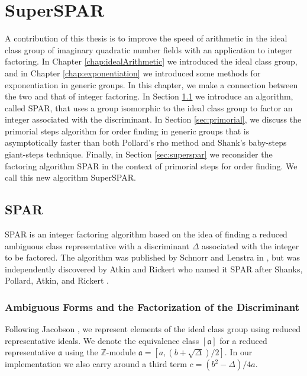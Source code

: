 \documentclass{ucalgthes1}
\theoremstyle{plain}
\theoremstyle{definition}
\newcommand{\ZZ}{\mathbb{Z}}
\begin{document}
\chapter{SuperSPAR}
\label{chap:superspar}

A contribution of this thesis is to improve the speed of arithmetic in the ideal class group of imaginary quadratic number fields with an application to integer factoring.  In Chapter \ref{chap:idealArithmetic} we introduced the ideal class group, and in Chapter \ref{chap:exponentiation} we introduced some methods for exponentiation in generic groups.  In this chapter, we make a connection between the two and that of integer factoring.  In Section \ref{sec:spar} we introduce an algorithm, called SPAR, that uses a group isomorphic to the ideal class group to factor an integer associated with the discriminant.  In Section \ref{sec:primorial}, we discuss the primorial steps algorithm for order finding in generic groups that is asymptotically faster than both Pollard's rho method and Shank's baby-steps giant-steps technique.  Finally, in Section \ref{sec:superspar} we reconsider the factoring algorithm SPAR in the context of primorial steps for order finding.  We call this new algorithm SuperSPAR.

\section{SPAR}
\label{sec:spar}

SPAR is an integer factoring algorithm based on the idea of finding a reduced ambiguous class representative with a discriminant $\Delta$ associated with the integer to be factored.  The algorithm was published by Schnorr and Lenstra in \cite{Schnorr1984}, but was independently discovered by Atkin and Rickert who named it SPAR after Shanks, Pollard, Atkin, and Rickert \cite[p.182]{Jacobson1999}.

\subsection{Ambiguous Forms and the Factorization of the Discriminant}

Following Jacobson \cite{Jacobson1999}, we represent elements of the ideal class group using reduced representative ideals.  We denote the equivalence class $[\mathfrak a]$ for a reduced representative $\mathfrak a$ using the $\ZZ$\mbox{-}module $\mathfrak a = [a, (b + \sqrt\Delta)/2]$. In our implementation we also carry around a third term $c = (b^2 - \Delta)/4a$.
\end{document}
